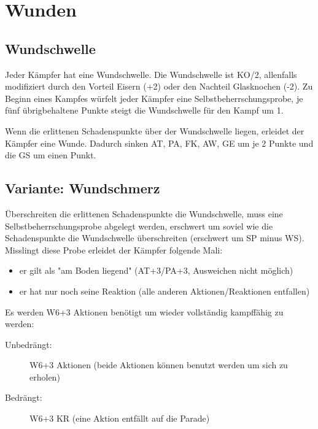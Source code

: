 %

\chapter{Wunden}
\section{Wundschwelle}
Jeder Kämpfer hat eine Wundschwelle.
Die Wundschwelle ist KO/2, allenfalls modifiziert durch den Vorteil Eisern (+2) oder den Nachteil Glasknochen (-2).
Zu Beginn eines Kampfes würfelt jeder Kämpfer eine Selbstbeherrschungsprobe, je fünf übrigbehaltene Punkte steigt die Wundschwelle für den Kampf um 1.

Wenn die erlittenen Schadenspunkte über der Wundschwelle liegen, erleidet der Kämpfer eine Wunde.
Dadurch sinken AT, PA, FK, AW, GE um je 2 Punkte und die GS um einen Punkt.

\section{Variante: Wundschmerz}
Überschreiten die erlittenen Schadenspunkte die Wundschwelle, muss eine Selbstbeherrschungsprobe abgelegt werden, erschwert um soviel wie die Schadenspunkte die Wundschwelle überschreiten (erschwert um SP minus WS).
Misslingt diese Probe erleidet der Kämpfer folgende Mali:
\begin{itemize}
    \item er gilt als "am Boden liegend" (AT+3/PA+3, Ausweichen nicht möglich)
    \item er hat nur noch seine Reaktion (alle anderen Aktionen/Reaktionen entfallen)
\end{itemize}
Es werden W6+3 Aktionen benötigt um wieder vollständig kampffähig zu werden:
\begin{description}
    \item[Unbedrängt:] W6+3 Aktionen (beide Aktionen können benutzt werden um sich zu erholen)
    \item[Bedrängt:] W6+3 KR (eine Aktion entfällt auf die Parade)
\end{description}

